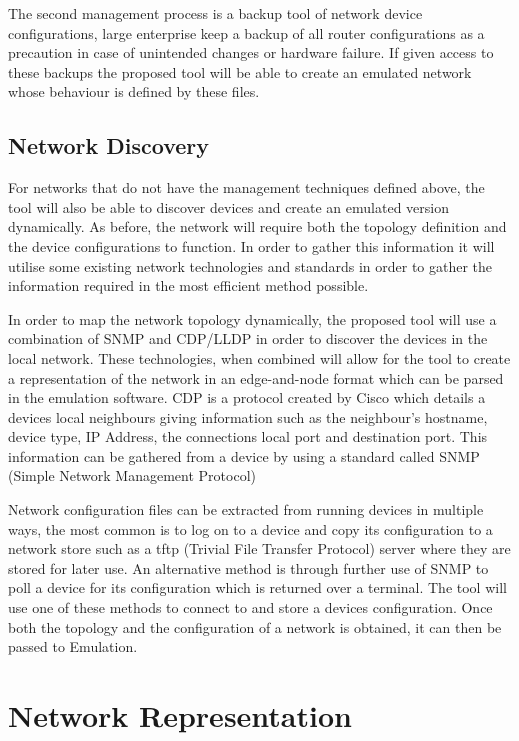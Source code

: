 \documentclass[11pt]{report}
\begin{document}
The second management process is a backup tool of network device configurations, large enterprise keep a backup of all router configurations as a precaution in case of unintended changes or hardware failure. If given access to these backups the proposed tool will be able to create an emulated network whose behaviour is defined by these files.

\subsection{Network Discovery}

For networks that do not have the management techniques defined above, the tool will also be able to discover devices and create an emulated version dynamically. As before, the network will require both the topology definition and the device configurations to function. In order to gather this information it will utilise some existing network technologies and standards in order to gather the information required in the most efficient method possible.

In order to map the network topology dynamically, the proposed tool will use a combination of SNMP and CDP/LLDP in order to discover the devices in the local network. These technologies, when combined will allow for the tool to create a representation of the network in an edge-and-node format which can be parsed in the emulation software. CDP is a protocol created by Cisco which details a devices local neighbours giving information such as the neighbour's hostname, device type, IP Address, the connections local port and destination port. This information can be gathered from a device by using a standard called SNMP (Simple Network Management Protocol)

Network configuration files can be extracted from running devices in multiple ways, the most common is to log on to a device and copy its configuration to a network store such as a tftp (Trivial File Transfer Protocol) server where they are stored for later use. An alternative method is through further use of SNMP to poll a device for its configuration which is returned over a terminal. The tool will use one of these methods to connect to and store a devices configuration. Once both the topology and the configuration of a network is obtained, it can then be passed to Emulation.

\section{Network Representation}
\end{document}
